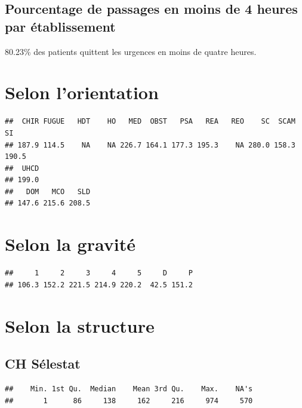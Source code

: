 \documentclass[12pt,english,french,twoside]{report}\usepackage[]{graphicx}\usepackage[]{color}
\makeatletter
\newenvironment{kframe}{%
 \def\at@end@of@kframe{}%
 \ifinner\ifhmode%
  \def\at@end@of@kframe{\end{minipage}}%
  \begin{minipage}{\columnwidth}%
 \fi\fi%
 \def\FrameCommand##1{\hskip\@totalleftmargin \hskip-\fboxsep
 \colorbox{shadecolor}{##1}\hskip-\fboxsep
     \hskip-\linewidth \hskip-\@totalleftmargin \hskip\columnwidth}%
 \MakeFramed {\advance\hsize-\width
   \@totalleftmargin\z@ \linewidth\hsize
   \@setminipage}}%
 {\par\unskip\endMakeFramed%
 \at@end@of@kframe}
\newenvironment{knitrout}{}{} %
\makeatother
\begin{document}
\subsection*{Pourcentage de passages en moins de 4 heures par établissement}



80.23\% des patients quittent les urgences en moins de quatre heures.

\section*{Selon l'orientation}
\begin{knitrout}
\color{fgcolor}\begin{kframe}
\begin{verbatim}
##  CHIR FUGUE   HDT    HO   MED  OBST   PSA   REA   REO    SC  SCAM    SI 
## 187.9 114.5    NA    NA 226.7 164.1 177.3 195.3    NA 280.0 158.3 190.5 
##  UHCD 
## 199.0
##   DOM   MCO   SLD 
## 147.6 215.6 208.5
\end{verbatim}
\end{kframe}
\end{knitrout}



\section*{Selon la gravité}
\begin{knitrout}
\color{fgcolor}\begin{kframe}
\begin{verbatim}
##     1     2     3     4     5     D     P 
## 106.3 152.2 221.5 214.9 220.2  42.5 151.2
\end{verbatim}
\end{kframe}
\end{knitrout}


\section*{Selon la structure}
\subsection{CH Sélestat}
\begin{knitrout}
\color{fgcolor}\begin{kframe}
\begin{verbatim}
##    Min. 1st Qu.  Median    Mean 3rd Qu.    Max.    NA's 
##       1      86     138     162     216     974     570
\end{verbatim}
\end{kframe}
\end{knitrout}
\end{document}
